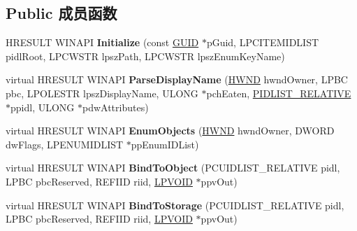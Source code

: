 \subsection*{Public 成员函数}
\begin{DoxyCompactItemize}
\item 
\mbox{\label{class_c_reg_folder_aebd306ad14a758574e052827d5b8de12}} 
H\+R\+E\+S\+U\+LT W\+I\+N\+A\+PI {\bfseries Initialize} (const \hyperlink{interface_g_u_i_d}{G\+U\+ID} $\ast$p\+Guid, L\+P\+C\+I\+T\+E\+M\+I\+D\+L\+I\+ST pidl\+Root, L\+P\+C\+W\+S\+TR lpsz\+Path, L\+P\+C\+W\+S\+TR lpsz\+Enum\+Key\+Name)
\item 
\mbox{\label{class_c_reg_folder_a12e69d281abc5f731f186d39190ec54d}} 
virtual H\+R\+E\+S\+U\+LT W\+I\+N\+A\+PI {\bfseries Parse\+Display\+Name} (\hyperlink{interfacevoid}{H\+W\+ND} hwnd\+Owner, L\+P\+BC pbc, L\+P\+O\+L\+E\+S\+TR lpsz\+Display\+Name, U\+L\+O\+NG $\ast$pch\+Eaten, \hyperlink{struct___i_t_e_m_i_d_l_i_s_t___r_e_l_a_t_i_v_e}{P\+I\+D\+L\+I\+S\+T\+\_\+\+R\+E\+L\+A\+T\+I\+VE} $\ast$ppidl, U\+L\+O\+NG $\ast$pdw\+Attributes)
\item 
\mbox{\label{class_c_reg_folder_a51a2b8281b18d908e1c22c2db973be4f}} 
virtual H\+R\+E\+S\+U\+LT W\+I\+N\+A\+PI {\bfseries Enum\+Objects} (\hyperlink{interfacevoid}{H\+W\+ND} hwnd\+Owner, D\+W\+O\+RD dw\+Flags, L\+P\+E\+N\+U\+M\+I\+D\+L\+I\+ST $\ast$pp\+Enum\+I\+D\+List)
\item 
\mbox{\label{class_c_reg_folder_a2491c8e3c5aa02ad6b7a080afa16c534}} 
virtual H\+R\+E\+S\+U\+LT W\+I\+N\+A\+PI {\bfseries Bind\+To\+Object} (P\+C\+U\+I\+D\+L\+I\+S\+T\+\_\+\+R\+E\+L\+A\+T\+I\+VE pidl, L\+P\+BC pbc\+Reserved, R\+E\+F\+I\+ID riid, \hyperlink{interfacevoid}{L\+P\+V\+O\+ID} $\ast$ppv\+Out)
\item 
\mbox{\label{class_c_reg_folder_abd48b7e54a6e7dc63e0adb30bbd40cf3}} 
virtual H\+R\+E\+S\+U\+LT W\+I\+N\+A\+PI {\bfseries Bind\+To\+Storage} (P\+C\+U\+I\+D\+L\+I\+S\+T\+\_\+\+R\+E\+L\+A\+T\+I\+VE pidl, L\+P\+BC pbc\+Reserved, R\+E\+F\+I\+ID riid, \hyperlink{interfacevoid}{L\+P\+V\+O\+ID} $\ast$ppv\+Out)
\item 
\mbox{\label{class_c_reg_folder_abff738b4a7f391da4e597478e280e5bb}} 

\end{DoxyCompactItemize}
